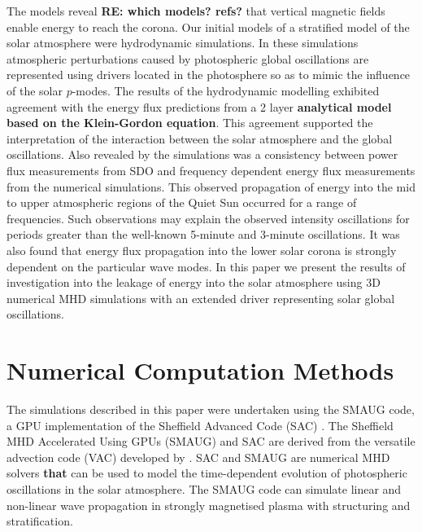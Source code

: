 \documentclass[physics,article,submit,pdftex,moreauthors]{Definitions/mdpi}
\begin{document}
 

The models reveal {\bf RE: which models? refs? } that vertical magnetic fields enable energy to reach the corona. Our initial models of a stratified model of the solar atmosphere \citet{Griffiths2018b} were hydrodynamic simulations. In these simulations atmospheric perturbations caused by photospheric global oscillations are represented using drivers located in the photosphere so as to mimic the influence of the solar $p$-modes. The results of the hydrodynamic modelling exhibited agreement  with the energy flux predictions from a 2 layer {\bf analytical model based on the Klein-Gordon equation}. This agreement supported the interpretation of the interaction between the solar atmosphere and the global oscillations. Also revealed by the simulations  was a consistency between power flux measurements from SDO and frequency dependent energy flux measurements from the numerical simulations. This observed propagation of energy into the mid to upper atmospheric regions of the Quiet Sun occurred for a range of frequencies. Such observations may explain the observed intensity oscillations for periods greater than the well-known 5-minute and 3-minute oscillations. It was also found that energy flux propagation into the lower solar corona is strongly dependent on the particular wave modes. In this paper we present the results of investigation into the leakage of energy into the solar atmosphere using 3D numerical MHD simulations with an extended driver representing solar global oscillations. 




\section{Numerical Computation Methods}


The simulations described in this paper were undertaken using the SMAUG code, a GPU implementation of the Sheffield Advanced Code (SAC) \citet{Shelyag2008}. The Sheffield MHD Accelerated Using GPUs (SMAUG) \citet{Griffiths2015} and SAC  are derived from the versatile advection code (VAC) developed by \citet{Toth1996}. SAC and SMAUG are numerical MHD solvers {\bf that} can be used to model the time-dependent evolution of photospheric oscillations in the solar atmosphere. The SMAUG code can simulate linear and non-linear wave propagation in strongly magnetised plasma with structuring and stratification.
\end{document}
